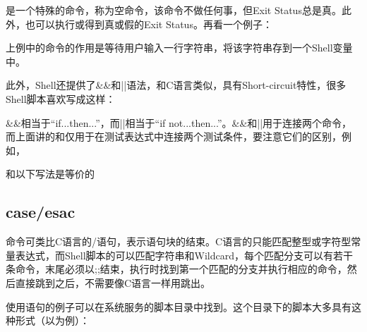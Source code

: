 

\BookCode{:\BookSplit{}}是一个特殊的命令，称为空命令，该命令不做任何事，但Exit Status总是真。此外，也可以执行或得到真或假的Exit Status。再看一个例子：




上例中的命令的作用是等待用户输入一行字符串，将该字符串存到一个Shell变量中。



此外，Shell还提供了\&\&和||语法，和C语言类似，具有Short-circuit特性，很多Shell脚本喜欢写成这样：




\&\&相当于“if.\BookSplit{}.\BookSplit{}.\BookSplit{}then.\BookSplit{}.\BookSplit{}.\BookSplit{}”，而||相当于“if not.\BookSplit{}.\BookSplit{}.\BookSplit{}then.\BookSplit{}.\BookSplit{}.\BookSplit{}”。\&\&和||用于连接两个命令，而上面讲的和仅用于在测试表达式中连接两个测试条件，要注意它们的区别，例如，




和以下写法是等价的



\subsection{case/esac}
%


命令可类比C语言的/语句，表示语句块的结束。C语言的只能匹配整型或字符型常量表达式，而Shell脚本的可以匹配字符串和Wildcard，每个匹配分支可以有若干条命令，末尾必须以;;结束，执行时找到第一个匹配的分支并执行相应的命令，然后直接跳到之后，不需要像C语言一样用跳出。




使用语句的例子可以在系统服务的脚本目录中找到。这个目录下的脚本大多具有这种形式（以为例）：




